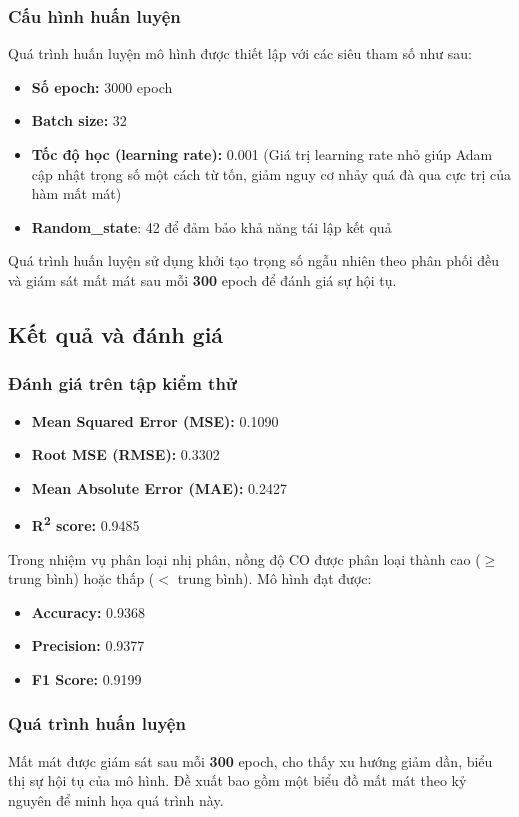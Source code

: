 \subsubsection{Cấu hình huấn luyện}
Quá trình huấn luyện mô hình được thiết lập với các siêu tham số như sau:
\begin{itemize}
    \item \textbf{Số epoch:} 3000 epoch
    \item \textbf{Batch size:} 32
    \item \textbf{Tốc độ học (learning rate):} 0.001 (Giá trị learning rate nhỏ giúp Adam cập nhật trọng số một cách từ tốn, giảm nguy cơ nhảy quá đà qua cực trị của hàm mất mát)
    \item \textbf{Random\_state}: 42 để đảm bảo khả năng tái lập kết quả
\end{itemize}

Quá trình huấn luyện sử dụng khởi tạo trọng số ngẫu nhiên theo phân phối đều và giám sát mất mát sau mỗi \textbf{300} epoch để đánh giá sự hội tụ.

\subsection{Kết quả và đánh giá}
\subsubsection{Đánh giá trên tập kiểm thử}
\begin{itemize}
    \item \textbf{Mean Squared Error (MSE):} 0.1090
    \item \textbf{Root MSE (RMSE):} 0.3302
    \item \textbf{Mean Absolute Error (MAE):} 0.2427
    \item \textbf{R\textsuperscript{2} score:} 0.9485
\end{itemize}
Trong nhiệm vụ phân loại nhị phân, nồng độ CO được phân loại thành cao ($\geq$ trung bình) hoặc thấp ($<$ trung bình). Mô hình đạt được:
\begin{itemize}
    \item \textbf{Accuracy:}  0.9368
    \item \textbf{Precision: } 0.9377
    \item \textbf{F1 Score:} 0.9199
\end{itemize}
\subsubsection{Quá trình huấn luyện}
Mất mát được giám sát sau mỗi \textbf{300} epoch, cho thấy xu hướng giảm dần, biểu thị sự hội tụ của mô hình. Đề xuất bao gồm một biểu đồ mất mát theo kỷ nguyên để minh họa quá trình này.

